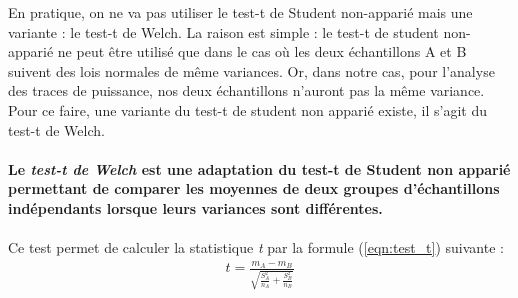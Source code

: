 \documentclass[10pt, oneside, a4paper]{article}
\begin{document}
En pratique, on ne va pas utiliser le test-t de Student non-apparié mais une variante : le test-t de Welch. La raison est simple : le test-t de student non-apparié ne peut être utilisé que dans le cas où les deux échantillons A et B suivent des lois normales de même variances. Or, dans notre cas, pour l'analyse des traces de puissance, nos deux échantillons n'auront pas la même variance. Pour ce faire, une variante du test-t de student non apparié existe, il s'agit du test-t de Welch.\\ \\
\textbf{Le \textit{test-t de Welch} est une adaptation du test-t de Student non apparié permettant de comparer les moyennes de deux groupes d’échantillons indépendants lorsque leurs variances sont différentes.} \\ \\
Ce test permet de calculer la statistique \textit{t} par la formule (\ref{eqn:test_t}) suivante :
\begin{gather}
	t=\frac{m_{A} - m_{B}}{\sqrt{\frac{S_{A}^2}{n_{A}} +\frac{S_{B}^2}{n_{B}}}}\label{eqn:test_t}
\end{gather}
\end{document}

